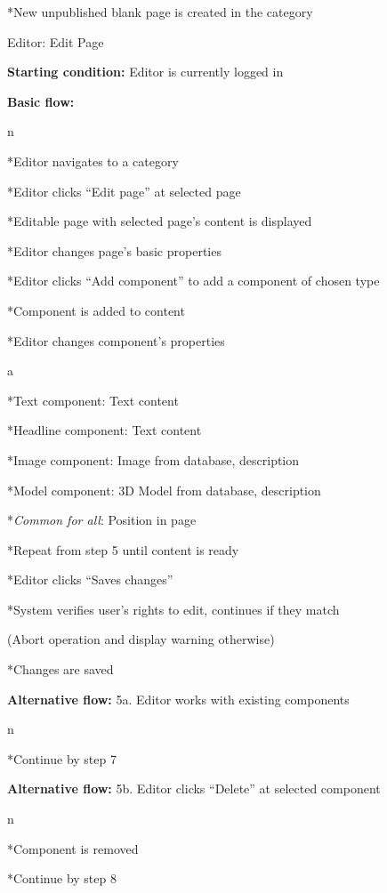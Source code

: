 *New unpublished blank page is created in the category

\enditems

\secc Editor: Edit Page

{\bf Starting condition:} Editor is currently logged in

{\bf Basic flow:}

\begitems \style n

*Editor navigates to a category

*Editor clicks “Edit page” at selected page

*Editable page with selected page’s content is displayed

*Editor changes page's basic properties

*Editor clicks “Add component” to add a component of chosen type

*Component is added to content

*Editor changes component’s properties

\begitems \style a

*Text component: Text content

*Headline component: Text content

*Image component: Image from database, description

*Model component: 3D Model from database, description

*{\it Common for all}: Position in page 

\enditems

*Repeat from step 5 until content is ready

*Editor clicks “Saves changes”

*System verifies user’s rights to edit, continues if they match

(Abort operation and display warning otherwise)

*Changes are saved

\enditems

{\bf Alternative flow:} 5a. Editor works with existing components

\begitems \style n

*Continue by step 7

\enditems

{\bf Alternative flow:} 5b. Editor clicks “Delete” at selected component

\begitems \style n

*Component is removed

*Continue by step 8

\enditems

